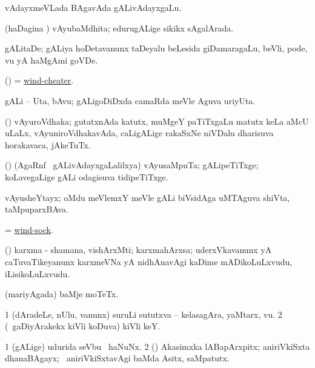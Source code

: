 \bentry
{}
\gl{\nA}
\bmng
vAdayxmeVLada BAgavAda gALivAdayxgaLu. 
\emng
\eentry

\bentry
{}
\gl{\gu}
\bmng
(haDagina \vi) vAyubaMdhita; edurugALige sikikx sAgalArada. 
\emng
\eentry

\bentry
{}
\gl{\nA}
\bmng
gALitaDe; gALiya hoDetavanunx taDeyalu beLesida giDamaragaLu, beVli, pode, \mo vu yA haMgAmi goVDe. 
\emng
\eentry

\bentry
{}
\gl{\nA}
\bmng
(\ame) = \hyperlink{wind-cheater}{wind-cheater}. 
\emng
\eentry

\bentry
{}
\gl{\nA}
\bmng
gALi -- Uta, bAvu; gALigoDiDxda camaRda meVle Aguva uriyUta. 
\emng
\eentry

\bentry
{}
\gl{\nA}
\bmng
(\birx) vAyuroVdhaka; gutatxnAda katutx, muMgeY paTiTxgaLu matutx keLa aMcU uLaLx, vAyuniroVdhakavAda, caLigALige rakaSxNe niVDalu dharisuva horakavaca, jAkeTuTx. 
\emng
\eentry

\bentry
{}
\gl{\nA}
\bmng
(\saM) (AgaRnf \mo\ gALivAdayxgaLalilxya) vAyusaMpuTa; gALipeTiTxge; koLavegaLige gALi odagisuva tidipeTiTxge. 
\emng
\eentry

\bentry
{}
\gl{\nA}
\bmng
vAyusheYtayx; oMdu meVlemxY meVle gALi biVsidAga uMTAguva shiVta, taMpuparxBAva. 
\emng
\eentry

\bentry
{}
\gl{\nA}
\bmng
= \hyperlink{wind-sock}{wind-sock}. 
\emng
\eentry

\bentry
{}
\gl{\nA}
\bmng
(\AmA) karxma - shamana, vishArxMti; karxmahArxsa; uderxVkavanunx yA caTuvaTikeyanunx karxmeVNa yA nidhAnavAgi kaDime mADikoLuLxvudu, iLisikoLuLxvudu. 
\emng
\eentry

\bentry
{}
\gl{\nA}
\bmng
(mariyAgada) baMje moTeTx. 
\emng
\eentry

\bentry
{}
\gl{\nA}
\bmng
\bnum
\num{1} (dAradeLe, nUlu, \mo vanunx) suruLi sututxva -- kelasagAra, yaMtarx, \mo vu. 
\num{2} (\kanmu\ gaDiyArakekx kiVli koDuva) kiVli keY. 
\enum
\emng
\eentry

\bentry
{}
\gl{\nA}
\bmng
\bnum
\num{1} (gALige) udurida seVbu \mo\ haNuNx. 
\num{2} (\rUpa) Akasimxka lABapArxpitx; aniriVkiSxta dhanaBAgayx; \kanmu\ aniriVkiSxtavAgi baMda Asitx, saMpatutx. 
\enum
\emng
\eentry

